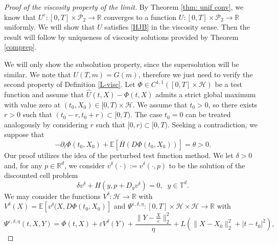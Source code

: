 \documentclass[reqno,11pt]{amsart}
\numberwithin{equation}{section}
\newcommand{\be}{\begin{equation}}
\newcommand{\ee}{\end{equation}}
\newcommand{\R}{\mathbb{R}} %
\newcommand{\e}{\varepsilon}
\newcommand{\T}{\mathbb{T}}
\newcommand{\nd}{\noindent}
\renewcommand{\hat}{\widehat}
\begin{document}
\vspace{3mm}

\begin{proof}[Proof of the viscosity property of the limit]
    By Theorem \ref{thm: unif conv}, we know that $U^\e\colon[0,T]\times \mathcal{P}_2\to \R$ converges to a function $U\colon [0,T]\times \mathcal{P}_2\to \R$ uniformly. We will show that $U$ satisfies \eqref{HJB} in the viscosity sense. Then the result will follow by uniqueness of viscosity solutions provided by Theorem \ref{comprep}.
    \vspace{2mm}

    \nd
     We will only show the subsolution property, since the supersolution will be similar. We note that $U(T,m)=G(m)$, therefore we just need to verify the second property of Definition \ref{L-visc}. Let $\Phi\in C^{1,1}([0,T]\times\mathcal{H})$ be a test function and assume that $\hat{U}(t,X)-\Phi(t,X)$ admits a strict global maximum with value zero at $(t_0,X_0)\in [0,T)\times\mathcal{H}$. We assume that $t_0>0$, so there exists $r>0$ such that $(t_0-r,t_0+r)\subset [0,T)$. The case $t_0=0$ can be treated analogously by considering $r$ such that $[0,r)\subset [0,T)$. Seeking a contradiction, we suppose that
     \be\label{"wrong" ineq}
-\partial_t\Phi(t_0,X_0)+\mathbb{E}\left[\overline{H}(D\Phi(t_0,X_0))\right]=\theta>0.
    \ee
    Our proof utilizes the idea of the perturbed test function method. We let $\delta>0$ and, for any $p\in \R^d$, we consider $v^\delta(\cdot):= v^\delta(\cdot, p)$ to be the solution of the discounted cell problem
    \be\label{discountedcell}
\delta v^\delta+ H(y, p+D_y v^\delta)=0,\;\; y\in\T^d.
    \ee
    We may consider the functions $V^\delta\colon\mathcal{H}\to \R$ with $V^\delta(X)=\mathbb{E}\left[ v^\delta(X,D\Phi(t_0,X_0)   \right]$ and $\Psi^{\e,\delta,\eta}\colon [0,T]\times \mathcal{H}\times\mathcal{H}\to \R$ with
    $$\Psi^{\e,\delta,\eta}(t,X,Y)=\Phi(t,X)+\e V^\delta(Y)+\frac{\|Y-\frac{X}{\e}\|_2^2}{\eta}+L\left(\|X-X_0\|_2^2+|t-t_0|^2  \right),$$

\end{proof}
\end{document}
